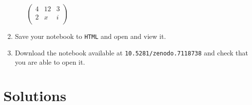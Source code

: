 \begin{enumerate}
\begin{enumerate}
\(\begin{pmatrix}4 & 12 & 3\\2 & x & i\\\end{pmatrix}\)

\end{enumerate}

\item 

Save your notebook to \texttt{HTML} and open and view it.

\item 

Download the notebook available at
\texttt{10.5281/zenodo.7118738} and
check that you are able to open it.

\end{enumerate}




\section{Solutions}

\label{\detokenize{tools-for-mathematics/01-using-notebooks/solutions/main:question-1}}

